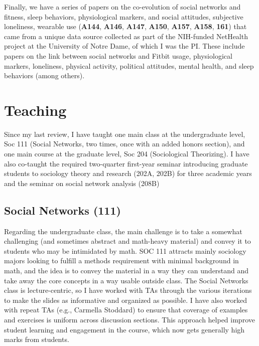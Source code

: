 \documentclass[a4paper,11pt]{extarticle}
\begin{document}
Finally, we have a series of papers on the co-evolution of social networks and fitness, sleep behaviors, physiological markers, and social attitudes, subjective loneliness, wearable use (\textbf{A144}, \textbf{A146}, \textbf{A147}, \textbf{A150}, \textbf{A157}, \textbf{A158}, \textbf{161}) that came from a unique data source collected as part of the NIH-funded NetHealth project at the University of Notre Dame, of which I was the PI. These include papers on the link between social networks and Fitbit usage, physiological markers, loneliness, physical activity, political attitudes, mental health, and sleep behaviors (among others).

\section*{Teaching}
Since my last review, I have taught one main class at the undergraduate level, Soc 111 (Social Networks, two times, once with an added honors section), and one main course at the graduate level, Soc 204 (Sociological Theorizing). I have also co-taught the required two-quarter first-year seminar introducing graduate students to sociology theory and research (202A, 202B) for three academic years and the seminar on social network analysis (208B)

\subsection*{Social Networks (111)}
Regarding the undergraduate class, the main challenge is to take a somewhat challenging (and sometimes abstract and math-heavy material) and convey it to students who may be intimidated by math. SOC 111 attracts mainly sociology majors looking to fulfill a methods requirement with minimal background in math, and the idea is to convey the material in a way they can understand and take away the core concepts in a way usable outside class. The Social Networks class is lecture-centric, so I have worked with TAs through the various iterations to make the slides as informative and organized as possible. I have also worked with repeat TAs (e.g., Carmella Stoddard) to ensure that coverage of examples and exercises is uniform across discussion sections. This approach helped improve student learning and engagement in the course, which now gets generally high marks from students. 
\end{document}
